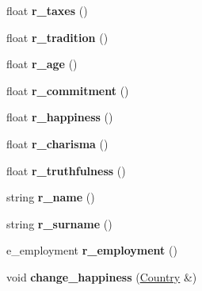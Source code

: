 \begin{DoxyCompactItemize}
\item 
\hypertarget{classCitizen_af274325e647c727dc317d16c45182242}{float {\bfseries r\+\_\+taxes} ()}\label{classCitizen_af274325e647c727dc317d16c45182242}

\item 
\hypertarget{classCitizen_a7cd55ebc796a7a02a37ab531ca5dc810}{float {\bfseries r\+\_\+tradition} ()}\label{classCitizen_a7cd55ebc796a7a02a37ab531ca5dc810}

\item 
\hypertarget{classCitizen_a28595d40a25a0067e03e9e60234f9d0c}{float {\bfseries r\+\_\+age} ()}\label{classCitizen_a28595d40a25a0067e03e9e60234f9d0c}

\item 
\hypertarget{classCitizen_ae7d66a8413827f2f8a99f5249042a6a4}{float {\bfseries r\+\_\+commitment} ()}\label{classCitizen_ae7d66a8413827f2f8a99f5249042a6a4}

\item 
\hypertarget{classCitizen_afdba41f72cc1e010baf58184bbaa9201}{float {\bfseries r\+\_\+happiness} ()}\label{classCitizen_afdba41f72cc1e010baf58184bbaa9201}

\item 
\hypertarget{classCitizen_ac6910f4806f91e13f63cd6ec8ac32914}{float {\bfseries r\+\_\+charisma} ()}\label{classCitizen_ac6910f4806f91e13f63cd6ec8ac32914}

\item 
\hypertarget{classCitizen_a772669257dcd4815714058c243601674}{float {\bfseries r\+\_\+truthfulness} ()}\label{classCitizen_a772669257dcd4815714058c243601674}

\item 
\hypertarget{classCitizen_ad4a335ed6bf3b199304112787819015d}{string {\bfseries r\+\_\+name} ()}\label{classCitizen_ad4a335ed6bf3b199304112787819015d}

\item 
\hypertarget{classCitizen_a8e868778440ed9cdf83765d329641986}{string {\bfseries r\+\_\+surname} ()}\label{classCitizen_a8e868778440ed9cdf83765d329641986}

\item 
\hypertarget{classCitizen_a153ba63abac575eccb5d6628d7f0e04b}{e\+\_\+employment {\bfseries r\+\_\+employment} ()}\label{classCitizen_a153ba63abac575eccb5d6628d7f0e04b}

\item 
\hypertarget{classCitizen_ac37f5faf9f9cab0dc4418966bce6c1cd}{void {\bfseries change\+\_\+happiness} (\hyperlink{classCountry}{Country} \&)}\label{classCitizen_ac37f5faf9f9cab0dc4418966bce6c1cd}


\end{DoxyCompactItemize}
